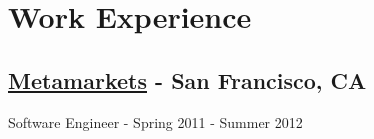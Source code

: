 \documentclass[oneside]{article}
\begin{document}


\newpage
\section{Work Experience}

  \subsection{\href{http://metamarkets.com/}{Metamarkets} - San Francisco, CA}

    Software Engineer - Spring 2011 - Summer 2012
\end{document}
